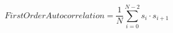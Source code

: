 \begin{equation}
\mathit{FirstOrderAutocorrelation} = \frac{1}{N} \sum_{i=0}^{N-2} s_i \cdot s_{i+1}
\label{formula_first_order_autocorrelation}
\end{equation}
